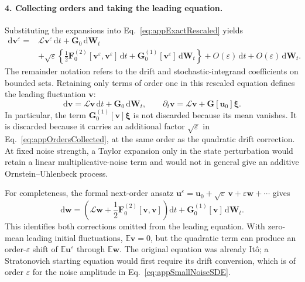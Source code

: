 \documentclass{article}
\begin{document}
\paragraph{4. Collecting orders and taking the leading equation.}
Substituting the expansions into Eq.~\eqref{eq:appExactRescaled} yields
\begin{align}
    \mathrm d\mathbf v^\varepsilon
    ={}&\mathcal L\mathbf v^\varepsilon\,\mathrm dt+\mathbf G_0\,\mathrm d\mathbf W_t\nonumber\\
    &+\sqrt{\varepsilon}\left\{
    \frac12\mathbf F_0^{(2)}[\mathbf v^\varepsilon,\mathbf v^\varepsilon]\,\mathrm dt
    +\mathbf G_0^{(1)}[\mathbf v^\varepsilon]\,\mathrm d\mathbf W_t\right\}
    +O(\varepsilon)\,\mathrm dt+O(\varepsilon)\,\mathrm d\mathbf W_t.
    \label{eq:appOrdersCollected}
\end{align}
The remainder notation refers to the drift and stochastic-integrand coefficients on bounded sets. Retaining only terms of order one in this rescaled equation defines the leading fluctuation $\mathbf v$:
\begin{equation}
    \mathrm d\mathbf v=\mathcal L\mathbf v\,\mathrm dt+\mathbf G_0\,\mathrm d\mathbf W_t,
    \qquad\boxed{\partial_t\mathbf v=\mathcal L\mathbf v+\mathbf G[\mathbf u_0]\boldsymbol\xi.}
    \label{eq:appLeadingNoiseEquation}
\end{equation}
In particular, the term $\mathbf G_0^{(1)}[\mathbf v]\boldsymbol\xi$ is not discarded because its mean vanishes. It is discarded because it carries an additional factor $\sqrt{\varepsilon}$ in Eq.~\eqref{eq:appOrdersCollected}, at the same order as the quadratic drift correction. At fixed noise strength, a Taylor expansion only in the state perturbation would retain a linear multiplicative-noise term and would not in general give an additive Ornstein--Uhlenbeck process.

For completeness, the formal next-order ansatz $\mathbf u^\varepsilon=\mathbf u_0+\sqrt{\varepsilon}\,\mathbf v+\varepsilon\mathbf w+\cdots$ gives
\begin{equation}
    \mathrm d\mathbf w=\left(\mathcal L\mathbf w+
    \frac12\mathbf F_0^{(2)}[\mathbf v,\mathbf v]\right)\mathrm dt
    +\mathbf G_0^{(1)}[\mathbf v]\,\mathrm d\mathbf W_t.
    \label{eq:appNextOrderNoise}
\end{equation}
This identifies both corrections omitted from the leading equation. With zero-mean leading initial fluctuations, $\mathbb E\mathbf v=0$, but the quadratic term can produce an order-$\varepsilon$ shift of $\mathbb E\mathbf u^\varepsilon$ through $\mathbb E\mathbf w$. The original equation was already It\^{o}; a Stratonovich starting equation would first require its drift conversion, which is of order $\varepsilon$ for the noise amplitude in Eq.~\eqref{eq:appSmallNoiseSDE}.
\end{document}
